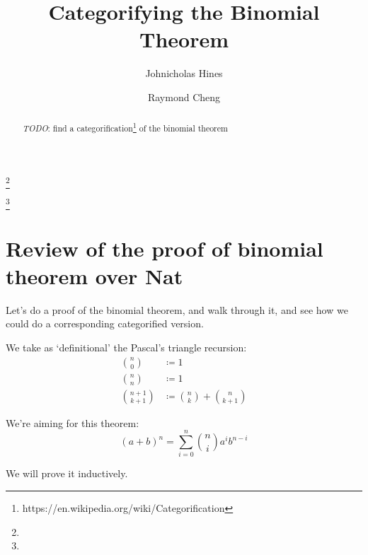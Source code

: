\documentclass{proc-l}
\theoremstyle{definition}
\theoremstyle{remark}
\numberwithin{equation}{section}
\begin{document}
\title[Categorifying the Binomial Theorem]{Categorifying the Binomial Theorem}


\author{Johnicholas Hines}
\address{}
\curraddr{}
\email{}
\thanks{}

\author{Raymond Cheng}
\address{}
\curraddr{}
\email{}
\thanks{}


\date{}

\dedicatory{}

\commby{}

\begin{abstract}
\emph{TODO}: find a categorification\footnote{https://en.wikipedia.org/wiki/Categorification} of the binomial theorem
\end{abstract}

\maketitle

\section{Review of the proof of binomial theorem over Nat}

Let's do a proof of the binomial theorem, and walk through it,
and see how we could do a corresponding categorified version.

We take as `definitional' the Pascal's triangle recursion:
\begin{align*}
{n \choose 0} & \coloneqq 1 \\
{n \choose n} & \coloneqq 1 \\
{n + 1 \choose k + 1} & \coloneqq {n \choose k} + {n \choose k+1}
\end{align*}

We're aiming for this theorem:
\[
(a + b)^n = \sum_{i=0}^n {n \choose i} a^i b^{n-i}
\]

We will prove it inductively.
\end{document}

